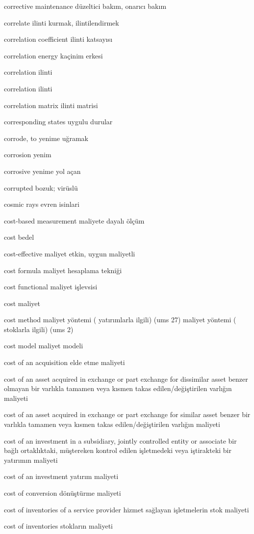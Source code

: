 \documentclass[12pt,fleqn]{article}\usepackage{../../common}
\begin{document}
corrective maintenance düzeltici bakım, onarıcı bakım

correlate ilinti kurmak, ilintilendirmek

correlation coefficient ilinti katsayısı

correlation energy kaçinim erkesi

correlation ilinti

correlation ilinti

correlation matrix ilinti matrisi

corresponding states uygulu durular

corrode, to yenime uğramak

corrosion yenim

corrosive yenime yol açan

corrupted bozuk; virüslü

cosmic rays evren isinlari

cost-based measurement maliyete dayalı ölçüm

cost bedel

cost-effective maliyet etkin, uygun maliyetli

cost formula maliyet hesaplama tekniği

cost functional maliyet işlevsisi

cost maliyet

cost method maliyet yöntemi ( yatırımlarla ilgili) (ums 27) maliyet yöntemi ( stoklarla ilgili) (ums 2)

cost model maliyet modeli

cost of an acquisition elde etme maliyeti

cost of an asset acquired in exchange or part exchange for dissimilar asset benzer olmayan bir varlıkla tamamen veya kısmen takas edilen/değiştirilen varlığın maliyeti

cost of an asset acquired in exchange or part exchange for similar asset benzer bir varlıkla tamamen veya kısmen takas edilen/değiştirilen varlığın maliyeti

cost of an investment in a subsidiary, jointly controlled entity or associate bir bağlı ortaklıktaki, müştereken kontrol edilen işletmedeki veya iştirakteki bir yatırımın maliyeti

cost of an investment yatırım maliyeti

cost of conversion dönüştürme maliyeti

cost of inventories of a service provider hizmet sağlayan işletmelerin stok maliyeti

cost of inventories stokların maliyeti
\end{document}
